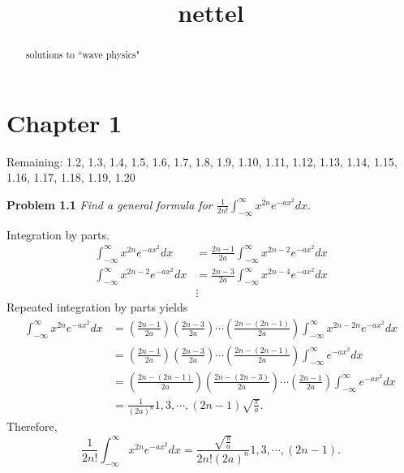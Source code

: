\documentclass{article}
\title{nettel}
\begin{document}
\maketitle
\begin{abstract}
solutions to ``wave physics"
\end{abstract}
\section{Chapter 1}
Remaining: 1.2, 1.3, 1.4, 1.5, 1.6, 1.7, 1.8, 1.9, 1.10, 1.11, 1.12, 1.13, 1.14, 1.15, 1.16, 1.17, 1.18, 1.19, 1.20

\noindent \textbf{Problem 1.1} \textit{Find a general formula for $\frac{1}{2n!} \int_{-\infty}^{\infty} x^{2n} e^{-ax^2} dx$}.

Integration by parts. 
\begin{align*}
\int_{-\infty}^{\infty} x^{2n} e^{-ax^2} dx &= \frac{2n-1}{2a} \int_{-\infty}^{\infty} x^{2n-2} e^{-ax^2} dx \\
\int_{-\infty}^{\infty} x^{2n-2} e^{-ax^2} dx &= \frac{2n-3}{2a} \int_{-\infty}^{\infty} x^{2n-4} e^{-ax^2} dx \\
& \vdots
\end{align*}
Repeated integration by parts yields
\begin{align*}
\int_{-\infty}^{\infty} x^{2n} e^{-ax^2} dx &= \left( \frac{2n-1}{2a} \right) \left( \frac{2n-3}{2a} \right) \cdots \left( \frac{2n-(2n-1)}{2a} \right) \int_{-\infty}^{\infty} x^{2n - 2n} e^{-ax^2} dx \\
&= \left( \frac{2n-1}{2a} \right) \left( \frac{2n-3}{2a} \right) \cdots \left( \frac{2n-(2n-1)}{2a} \right) \int_{-\infty}^{\infty} e^{-ax^2} dx \\
&=  \left( \frac{2n-(2n-1)}{2a} \right) \left( \frac{2n-(2n-3)}{2a} \right) \cdots \left( \frac{2n-1}{2a} \right) \int_{-\infty}^{\infty} e^{-ax^2} dx \\
&= \frac{1}{(2a)^n} 1, 3, \cdots{}, (2n-1) \sqrt{\frac{\pi}{a}}.
\end{align*}
Therefore,
\begin{equation*}
\frac{1}{2n!} \int_{-\infty}^{\infty} x^{2n} e^{-ax^2} dx = \frac{\sqrt{\frac{\pi}{a}}}{2n! (2a)^n} 1, 3, \cdots{}, (2n-1).
\end{equation*}
\end{document}
